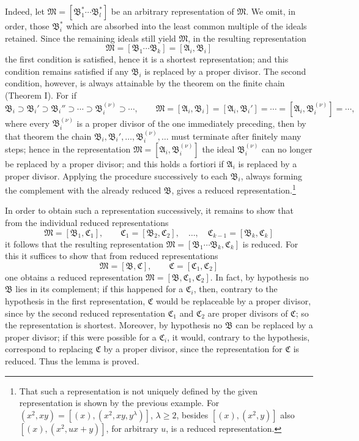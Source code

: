 \documentclass[11pt]{article}
\providecommand{\ideal}[1]{\mathfrak{#1}}
\begin{document}
Indeed, let $\ideal M=[\ideal B_1^*\cdots\ideal B_l^*]$ be an arbitrary representation of $\ideal M$. We omit, in order, those $\ideal B_i^*$ which are absorbed into the least common multiple of the ideals retained. Since the remaining ideals still yield $\ideal M$, in the resulting representation
\[
 \ideal M=[\ideal B_1\cdots\ideal B_k]=[\ideal A_i,\ideal B_i]
\]
the first condition is satisfied, hence it is a shortest representation; and this condition remains satisfied if any $\ideal B_i$ is replaced by a proper divisor. The second condition, however, is always attainable by the theorem on the finite chain (Theorem I). For if
\[
 \ideal B_i\supset \ideal B_i'\supset \ideal B_i''\supset\cdots\supset \ideal B_i^{(\nu)}\supset\cdots,
 \qquad
 \ideal M=[\ideal A_i,\ideal B_i]=[\ideal A_i,\ideal B_i']=\cdots=[\ideal A_i,\ideal B_i^{(\nu)}]=\cdots,
\]
where every $\ideal B_i^{(\nu)}$ is a proper divisor of the one immediately preceding, then by that theorem the chain $\ideal B_i,\ideal B_i',\ldots,\ideal B_i^{(\nu)},\ldots$ must terminate after finitely many steps; hence in the representation $\ideal M=[\ideal A_i,\ideal B_i^{(\nu)}]$ the ideal $\ideal B_i^{(\nu)}$ can no longer be replaced by a proper divisor; and this holds a fortiori if $\ideal A_i$ is replaced by a proper divisor. Applying the procedure successively to each $\ideal B_i$, always forming the complement with the already reduced $\ideal B$, gives a reduced representation.\footnote{That such a representation is not uniquely defined by the given representation is shown by the previous example. For $(x^2,xy)=[(x),(x^2,xy,y^\lambda)]$, $\lambda\ge2$, besides $[(x),(x^2,y)]$ also $[(x),(x^2,ux+y)]$, for arbitrary $u$, is a reduced representation.}

In order to obtain such a representation successively, it remains to show that from the individual reduced representations
\[
 \ideal M=[\ideal B_1,\ideal C_1],\qquad
 \ideal C_1=[\ideal B_2,\ideal C_2],\quad\ldots,\quad
 \ideal C_{k-1}=[\ideal B_k,\ideal C_k]
\]
it follows that the resulting representation $\ideal M=[\ideal B_1\cdots\ideal B_k,\ideal C_k]$ is reduced. For this it suffices to show that from reduced representations
\[
 \ideal M=[\ideal B,\ideal C],\qquad \ideal C=[\ideal C_1,\ideal C_2]
\]
one obtains a reduced representation $\ideal M=[\ideal B,\ideal C_1,\ideal C_2]$. In fact, by hypothesis no $\ideal B$ lies in its complement; if this happened for a $\ideal C_i$, then, contrary to the hypothesis in the first representation, $\ideal C$ would be replaceable by a proper divisor, since by the second reduced representation $\ideal C_1$ and $\ideal C_2$ are proper divisors of $\ideal C$; so the representation is shortest. Moreover, by hypothesis no $\ideal B$ can be replaced by a proper divisor; if this were possible for a $\ideal C_i$, it would, contrary to the hypothesis, correspond to replacing $\ideal C$ by a proper divisor, since the representation for $\ideal C$ is reduced. Thus the lemma is proved.
\end{document}
